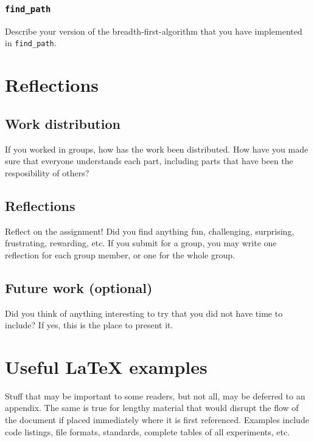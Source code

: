 \documentclass{article}
\begin{document}
\subsubsection{\texttt{find\_path}}
\label{sec:find_path}
Describe your version of the breadth-first-algorithm that you have
implemented in \texttt{find\_path}.
\section{Reflections}
\label{sec:orgd37f281}
\subsection{Work distribution}
\label{sec:org66520d9}
If you worked in groups, how has the work been distributed. How have
you made sure that everyone understands each part, including parts
that have been the resposibility of others?
\subsection{Reflections}
\label{sec:org2c6da4f}
Reflect on the assignment! Did you find anything fun, challenging,
surprising, frustrating, rewarding, etc. If you submit for a group,
you may write one reflection for each group member, or one for the whole group.

\subsection{Future work (optional)}
\label{sec:org2c448d8}

Did you think of anything interesting to try that you did not have
time to include? If yes, this is the place to present it.

\clearpage\appendix


\section{Useful \LaTeX{} examples}
\label{app:useful-latex-examples}
Stuff that may be important to some readers, but not all, may be
deferred to an appendix. The same is true for lengthy material that
would disrupt the flow of the document if placed immediately where it
is first referenced. Examples include code listings, file formats,
standards, complete tables of all experiments, etc.
\end{document}
